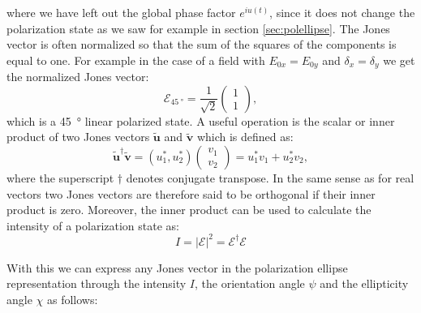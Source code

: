 where we have left out the global phase factor $e^{iu(t)}$, since it does not change the polarization state as we saw for example in section \ref{sec:polellipse}. The Jones vector is often normalized so that the sum of the squares of the components is equal to one. For example in the case of a field with $E_{0x}=E_{0y}$ and $\delta_x=\delta_y$ we get the normalized Jones vector:
\begin{equation}
    \bm{\mathcal{E}}_{\SI{45}{\degree}}= \frac{1}{\sqrt{2}}
    \begin{pmatrix}
    1 \\
    1
    \end{pmatrix},
\end{equation}
which is a \SI{45}{\degree} linear polarized state. A useful operation is the scalar or inner product of two Jones vectors $\bm{\tilde{u}}$ and $\bm{\tilde{v}}$ which is defined as:
\begin{equation}
    \bm{\tilde{u}}^{\dagger}\bm{\tilde{v}} = \left(u_1^{*}, u_2^{*} \right)
    \begin{pmatrix}
    v_1 \\
    v_2
    \end{pmatrix}
    = u_1^{*}v_1 + u_2^{*}v_2,
\end{equation}
where the superscript $\dagger$ denotes conjugate transpose. In the same sense as for real vectors two Jones vectors are therefore said to be orthogonal if their inner product is zero. Moreover, the inner product can be used to calculate the intensity of a polarization state as:
\begin{equation}
    I=|\bm{\mathcal{E}}|^2=\bm{\mathcal{E}}^{\dagger}\bm{\mathcal{E}}
\end{equation}

With this we can express any Jones vector in the polarization ellipse representation through the intensity $I$, the orientation angle $\psi$ and the ellipticity angle $\chi$ as follows:

